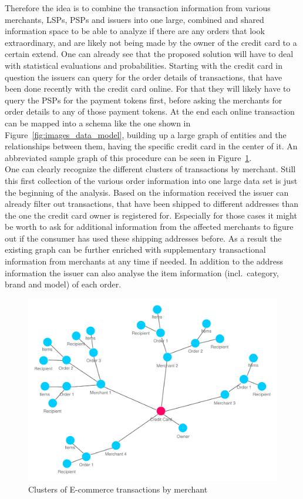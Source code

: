 Therefore the idea is to combine the transaction information from various merchants, \gls{LSP}s, \gls{PSP}s and issuers into one large, combined and shared information space to be able to analyze if there are any orders that look extraordinary, and are likely not being made by the owner of the credit card to a certain extend. One can already see that the proposed solution will have to deal with statistical evaluations and probabilities. Starting with the credit card in question the issuers can query for the order details of transactions, that have been done recently with the credit card online. For that they will likely have to query the \gls{PSP}s for the payment tokens first, before asking the merchants for order details to any of those payment tokens. At the end each online transaction can be mapped into a schema like the one shown in Figure~\ref{fig:images_data_model}, building up a large graph of entities and  the relationships between them, having the specific credit card in the center of it. An abbreviated sample graph of this procedure can be seen in Figure~\ref{fig:images_credit_card_graph}. \\

One can clearly recognize the different clusters of transactions by merchant. Still this first collection of the various order information into one large data set is just the beginning of the analysis. Based on the information received the issuer can already filter out transactions, that have been shipped to different addresses than the one the credit card owner is registered for. Especially for those cases it might be worth to ask for additional information from the affected merchants to figure out if the consumer has used these shipping addresses before. As a result the existing graph can be further enriched with supplementary transactional information from merchants at any time if needed. In addition to the address information the issuer can also analyse the item information (incl.\ category, brand and model) of each order. \\

\begin{figure}[!ht]
  \centering
  \includegraphics[width=0.9\columnwidth]{images/ontology_scenario_2.pdf}
  \caption{Clusters of E-commerce transactions by merchant}
\label{fig:images_credit_card_graph}
\end{figure}

